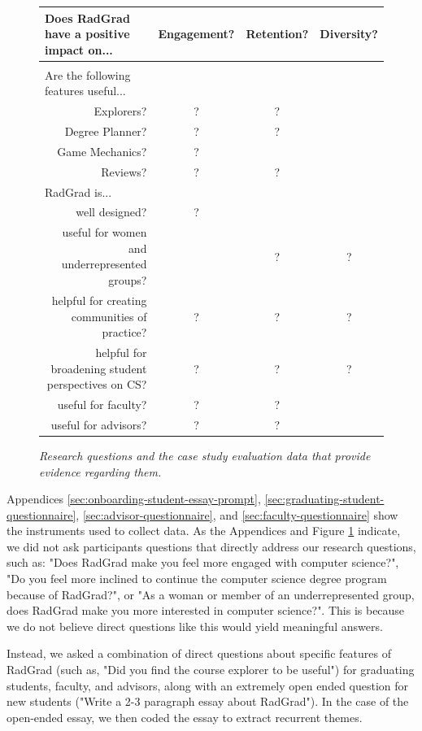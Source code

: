 \documentclass[acmsmall]{acmart}
\begin{document}
\begin{figure}[th]
\centering
\small
\begin{tabular}{ p{1in} p{1in} c c c }
\hline
\multicolumn{2}{l}{Does RadGrad have a positive impact on...} & Engagement? & Retention? & Diversity? \\
\hline\\[0.05cm]
Are the following features useful... & &  &  & \\
\multicolumn{2}{r}{Explorers?} & ? & ? & \\
\multicolumn{2}{r}{Degree Planner?} & ? & ? & \\
\multicolumn{2}{r}{Game Mechanics?} & ? &  & \\
\multicolumn{2}{r}{Reviews?} & ? & ? & \\[0.5cm]
RadGrad is... & &  &  & \\
\multicolumn{2}{r}{well designed?} & ? &  & \\
\multicolumn{2}{r}{useful for women and underrepresented groups?} &  & ? & ? \\
\multicolumn{2}{r}{helpful for creating communities of practice?} & ? & ? & ? \\
\multicolumn{2}{r}{helpful for broadening student perspectives on CS?} & ? & ? & ? \\
\multicolumn{2}{r}{useful for faculty?} & ? & ? & \\
\multicolumn{2}{r}{useful for advisors?} & ? & ? & \\
\hline
\end{tabular}
\caption{\em Research questions and the case study evaluation data that provide evidence regarding them.}
\normalsize
\label{fig:eval-questions}
\end{figure}

Appendices \ref{sec:onboarding-student-essay-prompt}, \ref{sec:graduating-student-questionnaire}, \ref{sec:advisor-questionnaire}, and \ref{sec:faculty-questionnaire} show the instruments used to collect data. As the Appendices and Figure \ref{fig:eval-questions} indicate, we did not ask participants questions that directly address our research questions, such as: "Does RadGrad make you feel more engaged with computer science?", "Do you feel more inclined to continue the computer science degree program because of RadGrad?", or "As a woman or member of an underrepresented group, does RadGrad make you more interested in computer science?".  This is because we do not believe direct questions like this would yield meaningful answers.

Instead, we asked a combination of direct questions about specific features of RadGrad (such as, "Did you find the course explorer to be useful") for graduating students, faculty, and advisors, along with an extremely open ended question for new students ("Write a 2-3 paragraph essay about RadGrad").  In the case of the open-ended essay, we then coded the essay to extract recurrent themes.
\end{document}
